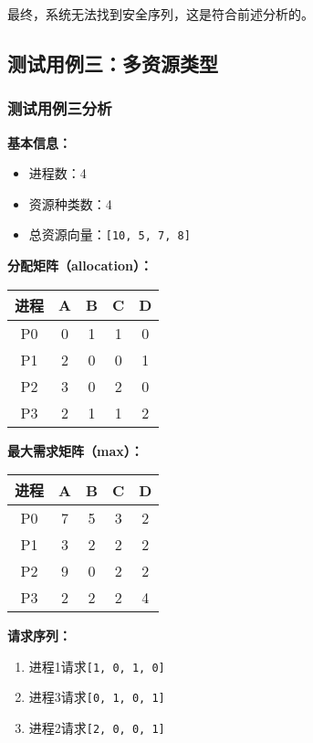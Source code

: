 \documentclass[12pt, a4paper, oneside]{ctexart}
\begin{document}
最终，系统无法找到安全序列，这是符合前述分析的。

\subsection{测试用例三：多资源类型}

\subsubsection{测试用例三分析}

\textbf{基本信息：}
\begin{itemize}
    \item 进程数：4
    \item 资源种类数：4
    \item 总资源向量：\texttt{[10, 5, 7, 8]}
\end{itemize}

\textbf{分配矩阵（allocation）：}
\begin{table}[H]
    \centering
    \begin{tabular}{c|cccc}
        \hline
        进程 & A & B & C & D \\
        \hline
        P0 & 0 & 1 & 1 & 0 \\
        P1 & 2 & 0 & 0 & 1 \\
        P2 & 3 & 0 & 2 & 0 \\
        P3 & 2 & 1 & 1 & 2 \\
        \hline
    \end{tabular}
\end{table}

\textbf{最大需求矩阵（max）：}
\begin{table}[H]
    \centering
    \begin{tabular}{c|cccc}
        \hline
        进程 & A & B & C & D \\
        \hline
        P0 & 7 & 5 & 3 & 2 \\
        P1 & 3 & 2 & 2 & 2 \\
        P2 & 9 & 0 & 2 & 2 \\
        P3 & 2 & 2 & 2 & 4 \\
        \hline
    \end{tabular}
\end{table}

\textbf{请求序列：}
\begin{enumerate}
    \item 进程1请求\texttt{[1, 0, 1, 0]}
    \item 进程3请求\texttt{[0, 1, 0, 1]}
    \item 进程2请求\texttt{[2, 0, 0, 1]}
\end{enumerate}
\end{document}
